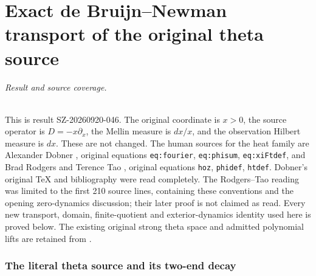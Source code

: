 \documentclass[11pt]{article}
\begin{document}
\endgroup

\clearpage\begingroup
\part*{Exact de Bruijn--Newman transport of the original theta source}
\newcommand{\hdtC}{\mathbb C}\newcommand{\hdtR}{\mathbb R}
\newcommand{\hdtB}{\mathscr B}\newcommand{\hdtEpi}{\mathscr E_\pi}
\newcommand{\hdtMell}{\mathcal M}\newcommand{\hdtSch}{\mathcal S}
\newcommand{\hdtord}{\operatorname{ord}}\newcommand{\hdttr}{\operatorname{tr}}
\newtheorem{hdttheorem}{Theorem}[section]
\newtheorem{hdtlemma}[hdttheorem]{Lemma}
\newtheorem{hdtproposition}[hdttheorem]{Proposition}
\newtheorem{hdtcorollary}[hdttheorem]{Corollary}
\newtheorem{hdtdefinition}[hdttheorem]{Definition}


\paragraph{Result and source coverage.}
This is result SZ-20260920-046. The original coordinate is $x>0$,
the source operator is $D=-x\partial_x$, the Mellin measure is $dx/x$,
and the observation Hilbert measure is $dx$. These are not changed.
The human sources for the heat family are Alexander Dobner
\cite{hdt:Dobner}, original equations \texttt{eq:fourier},
\texttt{eq:phisum}, \texttt{eq:xiFtdef}, and Brad Rodgers and
Terence Tao \cite{hdt:RT}, original equations \texttt{hoz},
\texttt{phidef}, \texttt{htdef}. Dobner's original TeX and bibliography
were read completely. The Rodgers--Tao reading was limited to the
first 210 source lines, containing these conventions and the opening
zero-dynamics discussion; their later proof is not claimed as read.
Every new transport, domain, finite-quotient and exterior-dynamics
identity used here is proved below. The existing original strong
theta space and admitted polynomial lifts are retained from
\cite{hdt:Closed,hdt:Native}.

\section{The literal theta source and its two-end decay}
\end{document}
